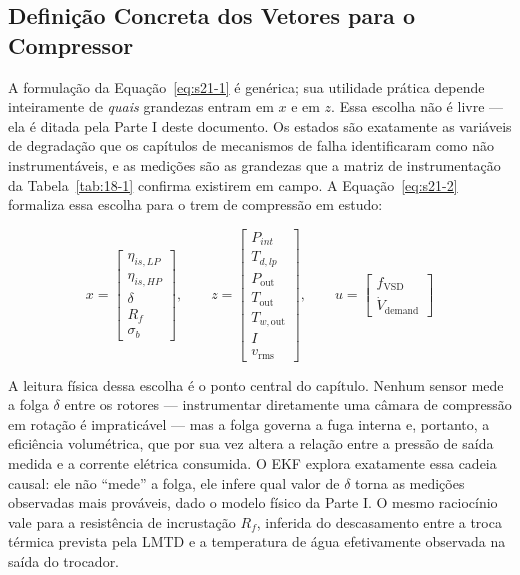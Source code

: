 \documentclass[12pt,a4paper]{article}
\numberwithin{equation}{section}
\numberwithin{table}{section}
\numberwithin{figure}{section}
\begin{document}
{	\subsection{Definição Concreta dos Vetores para o Compressor}

	A formulação da Equação~\eqref{eq:s21-1} é genérica; sua utilidade prática depende inteiramente de \textit{quais} grandezas entram em $x$ e em $z$. Essa escolha não é livre — ela é ditada pela Parte I deste documento. Os estados são exatamente as variáveis de degradação que os capítulos de mecanismos de falha identificaram como não instrumentáveis, e as medições são as grandezas que a matriz de instrumentação da Tabela~\ref{tab:18-1} confirma existirem em campo. A Equação~\eqref{eq:s21-2} formaliza essa escolha para o trem de compressão em estudo:

	\begin{equation}\label{eq:s21-2}
	x = \begin{bmatrix} \eta_{is,LP} \\ \eta_{is,HP} \\ \delta \\ R_f \\ \sigma_b \end{bmatrix}, \qquad
	z = \begin{bmatrix} P_{int} \\ T_{d,lp} \\ P_{\text{out}} \\ T_{\text{out}} \\ T_{w,\text{out}} \\ I \\ v_{\text{rms}} \end{bmatrix}, \qquad
	u = \begin{bmatrix} f_{\text{VSD}} \\ \dot{V}_{\text{demand}} \end{bmatrix}
\end{equation}

	A leitura física dessa escolha é o ponto central do capítulo. Nenhum sensor mede a folga $\delta$ entre os rotores — instrumentar diretamente uma câmara de compressão em rotação é impraticável — mas a folga governa a fuga interna e, portanto, a eficiência volumétrica, que por sua vez altera a relação entre a pressão de saída medida e a corrente elétrica consumida. O EKF explora exatamente essa cadeia causal: ele não ``mede'' a folga, ele infere qual valor de $\delta$ torna as medições observadas mais prováveis, dado o modelo físico da Parte I. O mesmo raciocínio vale para a resistência de incrustação $R_f$, inferida do descasamento entre a troca térmica prevista pela LMTD e a temperatura de água efetivamente observada na saída do trocador.

}
\end{document}
